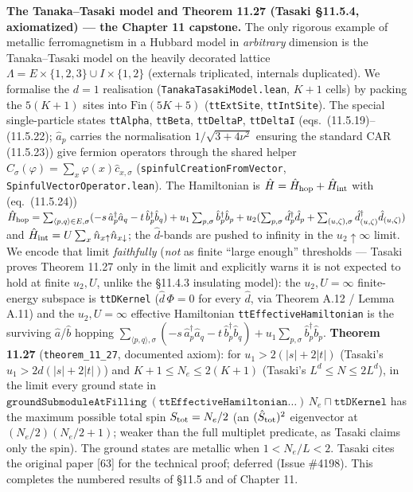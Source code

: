 \documentclass[a4paper,11pt]{article}
\begin{document}
\medskip\noindent\textbf{The Tanaka--Tasaki model and Theorem 11.27 (Tasaki §11.5.4,
axiomatized) --- the Chapter 11 capstone.}  The only rigorous example of metallic
ferromagnetism in a Hubbard model in \emph{arbitrary} dimension is the Tanaka--Tasaki model on
the heavily decorated lattice $\Lambda=E\times\{1,2,3\}\cup I\times\{1,2\}$ (externals
triplicated, internals duplicated).  We formalise the $d=1$ realisation
(\texttt{TanakaTasakiModel.lean}, $K+1$ cells) by packing the $5(K+1)$ sites into
$\mathrm{Fin}(5K+5)$ (\texttt{ttExtSite}, \texttt{ttIntSite}).  The special single-particle
states \texttt{ttAlpha}, \texttt{ttBeta}, \texttt{ttDeltaP}, \texttt{ttDeltaI}
(eqs.~(11.5.19)--(11.5.22); $\hat a_p$ carries the normalisation $1/\sqrt{3+4\nu^2}$ ensuring
the standard CAR (11.5.23)) give fermion operators through the shared helper
$\hat C_\sigma(\varphi)=\sum_x\varphi(x)\hat c_{x,\sigma}$ (\texttt{spinfulCreationFromVector},
\texttt{SpinfulVectorOperator.lean}).  The Hamiltonian is $\hat H=\hat H_{\rm hop}+\hat H_{\rm
int}$ with (eq.~(11.5.24))
$\hat H_{\rm hop}=\sum_{\langle p,q\rangle\in E,\sigma}(-s\,\hat a^\dagger_p\hat a_q
-t\,\hat b^\dagger_p\hat b_q)+u_1\sum_{p,\sigma}\hat b^\dagger_p\hat b_p
+u_2(\sum_{p,\sigma}\hat d^\dagger_p\hat d_p+\sum_{(u,\zeta),\sigma}\hat d^\dagger_{(u,\zeta)}\hat
d_{(u,\zeta)})$ and $\hat H_{\rm int}=U\sum_x\hat n_{x\uparrow}\hat n_{x\downarrow}$; the
$\hat d$-bands are pushed to infinity in the $u_2\uparrow\infty$ limit.  We encode that limit
\emph{faithfully} (\emph{not} as finite ``large enough'' thresholds --- Tasaki proves
Theorem 11.27 only in the limit and explicitly warns it is not expected to hold at finite
$u_2,U$, unlike the §11.4.3 insulating model): the $u_2,U=\infty$ finite-energy subspace is
\texttt{ttDKernel} ($\hat d\,\Phi=0$ for every $\hat d$, via Theorem A.12 / Lemma A.11) and the
$u_2,U=\infty$ effective Hamiltonian \texttt{ttEffectiveHamiltonian} is the surviving
$\hat a$/$\hat b$ hopping $\sum_{\langle p,q\rangle,\sigma}(-s\,\hat a^\dagger_p\hat a_q
-t\,\hat b^\dagger_p\hat b_q)+u_1\sum_{p,\sigma}\hat b^\dagger_p\hat b_p$.  \textbf{Theorem
11.27} (\texttt{theorem\_11\_27}, documented axiom): for $u_1>2(|s|+2|t|)$ (Tasaki's
$u_1>2d(|s|+2|t|)$) and $K+1\le N_e\le 2(K+1)$ (Tasaki's $L^d\le N\le 2L^d$), in the limit
every ground state in $\texttt{groundSubmoduleAtFilling}~(\texttt{ttEffectiveHamiltonian}\dots)\,N_e
\sqcap\texttt{ttDKernel}$ has the maximum possible total spin $S_{\rm tot}=N_e/2$ (an
$(\hat S_{\rm tot})^2$ eigenvector at $(N_e/2)(N_e/2+1)$; weaker than the full multiplet
predicate, as Tasaki claims only the spin).  The ground states are metallic when $1<N_e/L<2$.
Tasaki cites the original paper [63] for the technical proof; deferred (Issue \#4198).  This
completes the numbered results of §11.5 and of Chapter 11.
\end{document}
